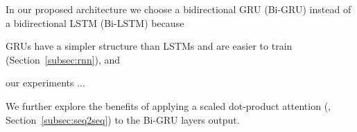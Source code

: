In our proposed architecture we choose a bidirectional GRU (Bi-GRU) instead of a bidirectional LSTM (Bi-LSTM) because
\begin{enumerate*}
    \item GRUs have a simpler structure than LSTMs and are easier to train (Section~\ref{subsec:rnn}), and
    \item our experiments ...
\end{enumerate*}

We further explore the benefits of applying a scaled dot-product attention (\cite{vaswani2017attention}, Section~\ref{subsec:seq2seq}) to the Bi-GRU layers output.

